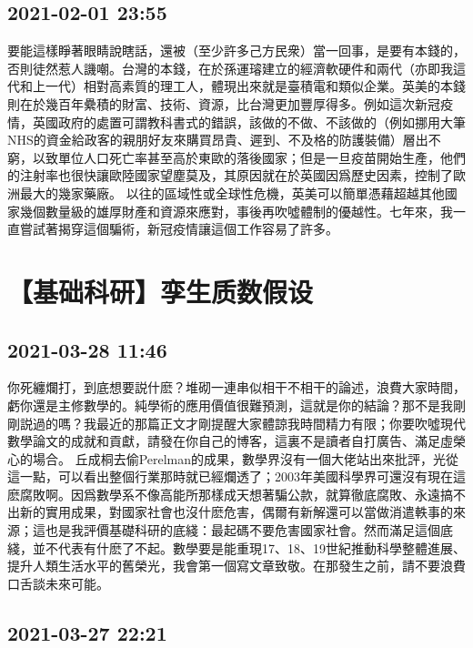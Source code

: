 \documentclass[twocolumn]{ctexart}
\begin{document}
\subsection*{2021-02-01 23:55}

要能這樣睜著眼睛說瞎話，還被（至少許多己方民衆）當一回事，是要有本錢的，否則徒然惹人譏嘲。台灣的本錢，在於孫運璿建立的經濟軟硬件和兩代（亦即我這代和上一代）相對高素質的理工人，體現出來就是臺積電和類似企業。英美的本錢則在於幾百年纍積的財富、技術、資源，比台灣更加豐厚得多。例如這次新冠疫情，英國政府的處置可謂教科書式的錯誤，該做的不做、不該做的（例如挪用大筆NHS的資金給政客的親朋好友來購買昂貴、遲到、不及格的防護裝備）層出不窮，以致單位人口死亡率甚至高於東歐的落後國家；但是一旦疫苗開始生產，他們的注射率也很快讓歐陸國家望塵莫及，其原因就在於英國因爲歷史因素，控制了歐洲最大的幾家藥廠。
以往的區域性或全球性危機，英美可以簡單憑藉超越其他國家幾個數量級的雄厚財產和資源來應對，事後再吹噓體制的優越性。七年來，我一直嘗試著揭穿這個騙術，新冠疫情讓這個工作容易了許多。
\section*{【基础科研】孪生质数假设}
\subsection*{2021-03-28 11:46}

你死纏爛打，到底想要説什麽？堆砌一連串似相干不相干的論述，浪費大家時間，虧你還是主修數學的。純學術的應用價值很難預測，這就是你的結論？那不是我剛剛説過的嗎？我最近的那篇正文才剛提醒大家體諒我時間精力有限；你要吹噓現代數學論文的成就和貢獻，請發在你自己的博客，這裏不是讀者自打廣告、滿足虛榮心的場合。
丘成桐去偷Perelman的成果，數學界沒有一個大佬站出來批評，光從這一點，可以看出整個行業那時就已經爛透了；2003年美國科學界可還沒有現在這麽腐敗啊。因爲數學系不像高能所那樣成天想著騙公款，就算徹底腐敗、永遠搞不出新的實用成果，對國家社會也沒什麽危害，偶爾有新解還可以當做消遣軼事的來源；這也是我評價基礎科研的底綫：最起碼不要危害國家社會。然而滿足這個底綫，並不代表有什麽了不起。數學要是能重現17、18、19世紀推動科學整體進展、提升人類生活水平的舊榮光，我會第一個寫文章致敬。在那發生之前，請不要浪費口舌談未來可能。
\subsection*{2021-03-27 22:21}
\end{document}

